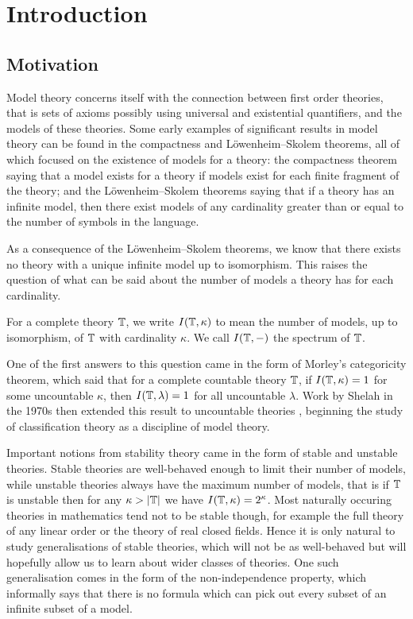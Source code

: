 \section{Introduction}%
\label{sec:introduction}

\subsection{Motivation}%
\label{sub:motivation}

Model theory concerns itself with the connection between first order theories, that is
sets of axioms possibly using universal and existential quantifiers, and the models of these
theories. Some early examples of significant results in model theory can be found in the
compactness and Löwenheim–Skolem theorems, all of which focused on the existence of models for a
theory: the compactness theorem saying that a model exists for a theory if models
exist for each finite fragment of the theory; and the Löwenheim–Skolem theorems saying
that if a theory has an infinite model, then there exist models of any cardinality
greater than or equal to the number of symbols in the language.

As a consequence of the Löwenheim–Skolem theorems, we know that there exists no theory
with a unique infinite model up to isomorphism. This raises the question of what can
be said about the number of models a theory has for each cardinality.

\begin{defn}
  For a complete theory $\mathbb{T}$, we write $I(\mathbb{T}, \kappa)$ to mean the number of
  models, up to isomorphism, of $\mathbb{T}$ with cardinality $\kappa$. We call
  $I(\mathbb{T}, -)$ the spectrum of $\mathbb{T}$.
\end{defn}

One of the first answers to this question came in the form of Morley's categoricity
theorem, which said that for a complete countable theory $\mathbb{T}$, if $I(\mathbb{T},\kappa) = 1$ for
some uncountable $\kappa$, then $I(\mathbb{T},\lambda) = 1$ for all uncountable $\lambda$. \cite{10.2307/1994188}
Work by Shelah in the 1970s then extended this result to uncountable theories
\cite{Sh:31}, beginning the study of classification theory as a discipline of model theory.

Important notions from stability theory came in the form of stable and unstable theories.
Stable theories are well-behaved enough to limit their number of models, while unstable theories
always have the maximum number of models, that is if $\mathbb{T}$ is unstable then
for any $\kappa > |\mathbb{T}|$ we have $I(\mathbb{T},\kappa) = 2^\kappa$. \cite{Sh:a}
Most naturally occuring
theories in mathematics tend not to be stable though, for example the full theory of any linear
order or the theory of real closed fields. Hence it is only natural to study generalisations of
stable theories, which will not be as well-behaved but will hopefully allow us to learn about
wider classes of theories. One such generalisation comes in the form of the non-independence
property, which informally says that there is no formula which can pick out every subset of
an infinite subset of a model.

